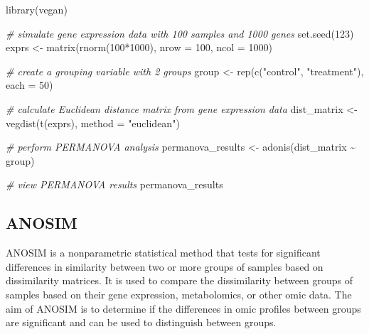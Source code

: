 \documentclass[
]{book}
\newenvironment{Shaded}{\begin{snugshade}}{\end{snugshade}}
\newcommand{\AttributeTok}[1]{\textcolor[rgb]{0.77,0.63,0.00}{#1}}
\newcommand{\CommentTok}[1]{\textcolor[rgb]{0.56,0.35,0.01}{\textit{#1}}}
\newcommand{\DecValTok}[1]{\textcolor[rgb]{0.00,0.00,0.81}{#1}}
\newcommand{\FunctionTok}[1]{\textcolor[rgb]{0.00,0.00,0.00}{#1}}
\newcommand{\NormalTok}[1]{#1}
\newcommand{\OtherTok}[1]{\textcolor[rgb]{0.56,0.35,0.01}{#1}}
\newcommand{\SpecialCharTok}[1]{\textcolor[rgb]{0.00,0.00,0.00}{#1}}
\newcommand{\StringTok}[1]{\textcolor[rgb]{0.31,0.60,0.02}{#1}}
\begin{document}
\small

\begin{Shaded}
\begin{Highlighting}[]
\FunctionTok{library}\NormalTok{(vegan)}

\CommentTok{\# simulate gene expression data with 100 samples and 1000 genes}
\FunctionTok{set.seed}\NormalTok{(}\DecValTok{123}\NormalTok{)}
\NormalTok{exprs }\OtherTok{\textless{}{-}} \FunctionTok{matrix}\NormalTok{(}\FunctionTok{rnorm}\NormalTok{(}\DecValTok{100}\SpecialCharTok{*}\DecValTok{1000}\NormalTok{), }\AttributeTok{nrow =} \DecValTok{100}\NormalTok{, }\AttributeTok{ncol =} \DecValTok{1000}\NormalTok{)}

\CommentTok{\# create a grouping variable with 2 groups}
\NormalTok{group }\OtherTok{\textless{}{-}} \FunctionTok{rep}\NormalTok{(}\FunctionTok{c}\NormalTok{(}\StringTok{"control"}\NormalTok{, }\StringTok{"treatment"}\NormalTok{), }\AttributeTok{each =} \DecValTok{50}\NormalTok{)}

\CommentTok{\# calculate Euclidean distance matrix from gene expression data}
\NormalTok{dist\_matrix }\OtherTok{\textless{}{-}} \FunctionTok{vegdist}\NormalTok{(}\FunctionTok{t}\NormalTok{(exprs), }\AttributeTok{method =} \StringTok{"euclidean"}\NormalTok{)}

\CommentTok{\# perform PERMANOVA analysis}
\NormalTok{permanova\_results }\OtherTok{\textless{}{-}} \FunctionTok{adonis}\NormalTok{(dist\_matrix }\SpecialCharTok{\textasciitilde{}}\NormalTok{ group)}

\CommentTok{\# view PERMANOVA results}
\NormalTok{permanova\_results}
\end{Highlighting}
\end{Shaded}

\normalsize

\hypertarget{anosim}{%
\subsection{ANOSIM}\label{anosim}}

ANOSIM is a nonparametric statistical method that tests for significant differences in similarity between two or more groups of samples based on dissimilarity matrices. It is used to compare the dissimilarity between groups of samples based on their gene expression, metabolomics, or other omic data. The aim of ANOSIM is to determine if the differences in omic profiles between groups are significant and can be used to distinguish between groups.

\small
\end{document}
